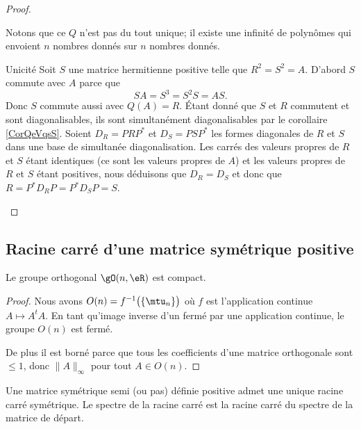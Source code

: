 \begin{proof}
\begin{subproof}
        Notons que ce \( Q\) n'est pas du tout unique; il existe une infinité de polynômes qui envoient \( n\) nombres donnés sur \( n\) nombres donnés.

    \item[Unicité]
        Soit \( S\) une matrice hermitienne positive telle que \( R^2=S^2=A\). D'abord \( S\) commute avec \( A\) parce que
        \begin{equation}
            SA=S^3=S^2S=AS.
        \end{equation}
        Donc \( S\) commute aussi avec \( Q(A)=R\). Étant donné que \( S\) et \( R\) commutent et sont diagonalisables, ils sont simultanément diagonalisables par le corollaire \ref{CorQeVqsS}. Soient \( D_R=PRP^*\) et \( D_S=PSP^*\) les formes diagonales de \( R\) et \( S\) dans une base de simultanée diagonalisation. Les carrés des valeurs propres de \( R\) et \( S\) étant identiques (ce sont les valeurs propres de \( A\)) et les valeurs propres de \( R\) et \( S\) étant positives, nous déduisons que \( D_R=D_S\) et donc que \( R=P^*D_RP=P^*D_SP=S\).
    \end{subproof}
\end{proof}

\subsection{Racine carré d'une matrice symétrique positive}

\begin{lemma}   \label{LemTLlTAAf}
    Le groupe orthogonal \( \gO(n,\eR) \) est compact.
\end{lemma}

\begin{proof}
    Nous avons \( O(n)=f^{-1}\big( \{ \mtu_n \} \big)\) où \( f\) est l'application continue \( A\mapsto A^tA\). En tant qu'image inverse d'un fermé par une application continue, le groupe \( O(n)\) est fermé.

    De plus il est borné parce que tous les coefficients d'une matrice orthogonale sont \( \leq 1\), donc \( \| A \|_{\infty}\) pour tout \( A\in O(n)\).
\end{proof}

\begin{proposition} \label{PropPEMDqVT}
    Une matrice symétrique semi (ou pas) définie positive admet une unique racine carré symétrique. Le spectre de la racine carré est la racine carré du spectre de la matrice de départ.
\end{proposition}

